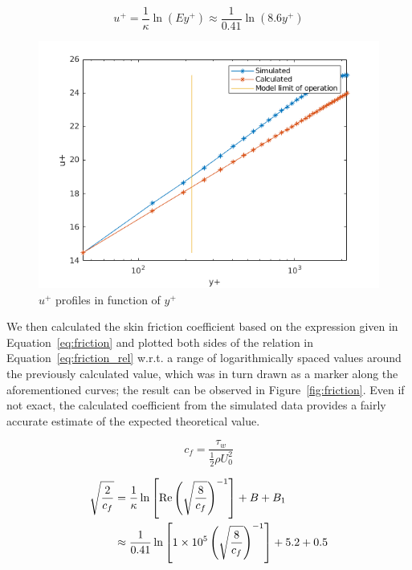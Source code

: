 \documentclass[12pt]{article}
\begin{document}
        \begin{equation} \label{eq:log_law}
                u^+ = \frac{1}{\kappa} \ln(E y^+) \approx \frac{1}{0.41} \ln(8.6y^+)
        \end{equation}
        
        \begin{figure}
                \centering
                \includegraphics[width=\textwidth]{Up_Profile.png}
                \caption{\( u^+ \) profiles in function of \( y^+ \)}
                \label{fig:u_plus}
        \end{figure}

        We then calculated the skin friction coefficient based on the expression given in Equation~\ref{eq:friction} and plotted both sides of the relation in Equation~\ref{eq:friction_rel} w.r.t. a range of logarithmically spaced values around the previously calculated value, which was in turn drawn as a marker along the aforementioned curves; the result can be observed in Figure~\ref{fig:friction}. Even if not exact, the calculated coefficient from the simulated data provides a fairly accurate estimate of the expected theoretical value.

        \begin{equation} \label{eq:friction}
                c_f = \frac{\tau_w}{\frac{1}{2} \rho U_0^2}
        \end{equation}

        \begin{equation} \label{eq:friction_rel}
                \begin{split}
                        \sqrt{\frac{2}{c_f}} & = \frac{1}{\kappa} \ln \left[ \text{Re} \left( \sqrt{\frac{8}{c_f}} \right)^{-1} \right] + B + B_1 \\
                        & \approx \frac{1}{0.41} \ln \left[ \num{1E5} \left( \sqrt{\frac{8}{c_f}} \right)^{-1} \right] + 5.2 + 0.5
                \end{split}
        \end{equation}
\end{document}
